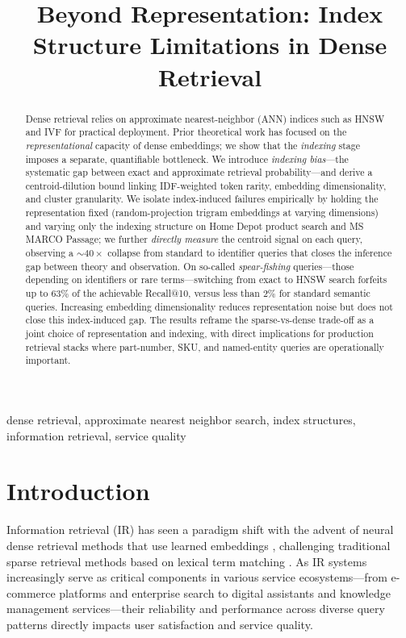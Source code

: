 \documentclass[conference]{IEEEtran}
\begin{document}
\title{Beyond Representation: Index Structure Limitations in Dense Retrieval}

\author{
}

\maketitle

\begin{abstract}
Dense retrieval relies on approximate nearest-neighbor (ANN) indices such as HNSW and IVF for practical deployment. Prior theoretical work has focused on the \emph{representational} capacity of dense embeddings; we show that the \emph{indexing} stage imposes a separate, quantifiable bottleneck. We introduce \emph{indexing bias}---the systematic gap between exact and approximate retrieval probability---and derive a centroid-dilution bound linking IDF-weighted token rarity, embedding dimensionality, and cluster granularity. We isolate index-induced failures empirically by holding the representation fixed (random-projection trigram embeddings at varying dimensions) and varying only the indexing structure on Home Depot product search and MS MARCO Passage; we further \emph{directly measure} the centroid signal on each query, observing a $\sim\!40\times$ collapse from standard to identifier queries that closes the inference gap between theory and observation. On so-called \emph{spear-fishing} queries---those depending on identifiers or rare terms---switching from exact to HNSW search forfeits up to $63\%$ of the achievable Recall@10, versus less than $2\%$ for standard semantic queries. Increasing embedding dimensionality reduces representation noise but does not close this index-induced gap. The results reframe the sparse-vs-dense trade-off as a joint choice of representation and indexing, with direct implications for production retrieval stacks where part-number, SKU, and named-entity queries are operationally important.
\end{abstract}

\begin{IEEEkeywords}
dense retrieval, approximate nearest neighbor search, index structures, information retrieval, service quality
\end{IEEEkeywords}

\section{Introduction}
Information retrieval (IR) has seen a paradigm shift with the advent of neural dense retrieval methods that use learned embeddings \cite{ma2022survey}, challenging traditional sparse retrieval methods based on lexical term matching \cite{karpukhin2020dense, xiong2021approximate}. As IR systems increasingly serve as critical components in various service ecosystems—from e-commerce platforms and enterprise search to digital assistants and knowledge management services—their reliability and performance across diverse query patterns directly impacts user satisfaction and service quality.
\end{document}

